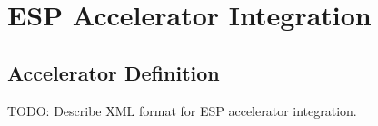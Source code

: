 \section{ESP Accelerator Integration}
\label{sec:integration}

\subsection{Accelerator Definition}
\label{sec:xml}

TODO: Describe XML format for ESP accelerator integration.
